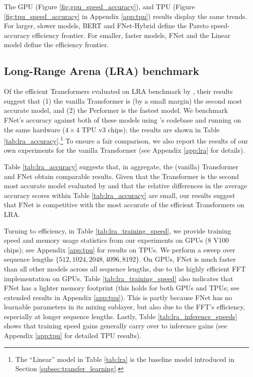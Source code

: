 The GPU (Figure \ref{fig:gpu_speed_accuracy}), and TPU (Figure \ref{fig:tpu_speed_accuracy} in Appendix \ref{app:tpu}) results display the same trends. For larger, slower models, BERT and FNet-Hybrid define the Pareto speed-accuracy efficiency frontier. For smaller, faster models, FNet and the Linear model define the efficiency frontier.

\subsection{Long-Range Arena (LRA) benchmark}
\label{subsec:lra}

Of the efficient Transformers evaluated on LRA benchmark by \citet{tay2020long}, their results suggest that (1) the vanilla Transformer is (by a small margin) the second most accurate model, and (2) the Performer \citep{choromanski2020rethinking} is the fastest model.  We benchmark FNet's accuracy against both of these models using \citet{tay2020long}'s codebase and running on the same hardware ($4\times4$ TPU v3 chips); the results are shown in Table \ref{tab:lra_accuracy}.\footnote{The ``Linear'' model in Table \ref{tab:lra} is the baseline model introduced in Section \ref{subsec:transfer_learning}.} To ensure a fair comparison, we also report the results of our own experiments for the vanilla Transformer (see Appendix \ref{app:lra} for details). 

Table \ref{tab:lra_accuracy} suggests that, in aggregate, the (vanilla) Transformer and FNet obtain comparable results. Given that the Transformer is the second most accurate model evaluated by \citet{tay2020long} and that the relative differences in the average accuracy scores within Table \ref{tab:lra_accuracy} are small, our results suggest that FNet is competitive with the most accurate of the efficient Transformers on LRA.

Turning to efficiency, in Table \ref{tab:lra_training_speed}, we provide training speed and memory usage statistics from our experiments on GPUs ($8$ V100 chips); see Appendix \ref{app:tpu} for results on TPUs. We perform a sweep over sequence lengths $\{512, 1024, 2048, 4096, 8192\}$. On GPUs, FNet is much faster than all other models across all sequence lengths, due to the highly efficient FFT implementation on GPUs.  Table \ref{tab:lra_training_speed} also indicates that FNet has a lighter memory footprint (this holds for both GPUs and TPUs; see extended results in Appendix \ref{app:tpu}). This is partly because FNet has no learnable parameters in its mixing sublayer, but also due to the FFT's efficiency, especially at longer sequence lengths. Lastly, Table \ref{tab:lra_inference_speeds} shows that training speed gains generally carry over to inference gains (see Appendix \ref{app:tpu} for detailed TPU results).

